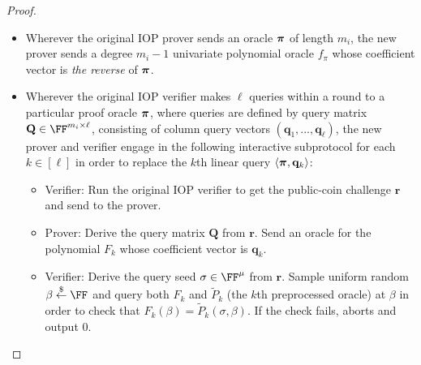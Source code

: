 \begin{proof}
\begin{itemize}

\item Wherever the original IOP prover sends an oracle $\boldsymbol{\pi}$ of length $m_i$, the new prover sends a degree $m_i - 1$ univariate polynomial oracle $f_\pi$ whose coefficient vector is \emph{the reverse} of $\boldsymbol{\pi}$. 

\item Wherever the original IOP verifier makes $\ell$ queries within a round to a particular proof oracle $\boldsymbol{\pi}$, where queries are defined by query matrix $\mathbf{Q} \in \FF^{m_i \times \ell}$, consisting of column query vectors $(\mathbf{q}_1,...,\mathbf{q}_\ell)$, the new prover and verifier engage in the following interactive subprotocol for each $k \in [\ell]$ in order to replace the $k$th linear query $\langle \boldsymbol{\pi}, \mathbf{q}_k \rangle$: 

\begin{itemize}
\item Verifier: Run the original IOP verifier to get the public-coin challenge $\mathbf{r}$ and send to the prover.
 \item Prover: Derive the query matrix $\mathbf{Q}$ from $\mathbf{r}$. Send an oracle for the polynomial $F_k$ whose coefficient vector is $\mathbf{q}_k$. %
 
 \item Verifier: Derive the query seed $\sigma \in \FF^\mu$ from $\mathbf{r}$. Sample uniform random $\beta \sample \FF$ and query both $F_k$ and $\tilde{P}_k$ (the $k$th preprocessed oracle) at $\beta$ in order to check that $F_k (\beta) = \tilde{P}_k(\sigma, \beta)$. If the check fails, aborts and output 0. %
 
 

\end{itemize}
\end{itemize}
\end{proof}
